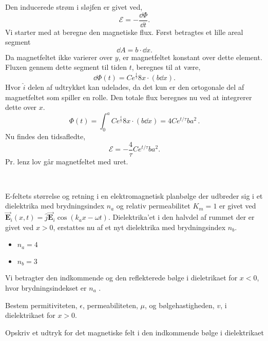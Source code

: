 \begin{solution}
Den inducerede strøm i sløjfen er givet ved,
\[
\mathcal{E} = -\frac{\dd \Phi}{\dd  t}
.\]
Vi starter med at beregne den magnetiske flux. Først betragtes et lille areal segment
\[
\dd A = b \cdot \dd x
.\]
Da magnetfeltet ikke varierer over $y$, er magnetfeltet konstant over dette element. Fluxen gennem dette segment til tiden $t$, beregnes til at være,
 \[
\dd \Phi \left( t \right) = Ce^{\frac{t}{\tau}}8x \cdot \left( b\dd x \right)  
.\]
Hvor $\hat{i}$ delen af udtrykket kan udelades, da det kun er den ortogonale del af magnetfeltet som spiller en rolle. Den totale flux beregnes nu ved at integrerer dette over $x$.
 \[
\Phi\left( t \right) = \int_{0}^{a} Ce^{\frac{t}{\tau}}8x \cdot \left( b\dd x \right)  = 4Ce^{t / \tau}ba^2
 \, 
.\]
Nu findes den tidsafledte,
\[
\mathcal{E} = -\frac{4}{\tau} Ce^{t / \tau}ba^2
.\]
Pr. lenz lov går magnetfeltet med uret.
\end{solution}\\
\begin{exercise}[Opgave 6]
E-feltets størrelse og retning i en elektromagnetisk planbølge der udbreder
sig i et dielektrika med brydningsindex $n_a$ og relativ permeabilitet $K_m = 1$ er
givet ved $\vec{\mathbf{E}} _i\left( x,t \right) = \hat{j}\vec{\mathbf{E}} _i\cos\left( k_ax-\omega t \right) $. Dielektrika’et i den halvdel af rummet der er givet ved $x > 0$, erstattes nu af et nyt dielektrika med brydningsindex $n_b$.
\begin{itemize}
	\item $n_a = 4$
	\item $n_b = 3$
\end{itemize}
Vi betragter den indkommende og den reflekterede bølge i dieletrikaet for $x < 0$, hvor brydningsindekset er $n_a$ .
\end{exercise}
\begin{subexercise}[i]
Bestem permitiviteten, $\epsilon$, permeabiliteten, $\mu$, og bølgehastigheden, $v$, i dielektrikaet for $x>0$.
\end{subexercise}
\begin{solution}

\end{solution}
\begin{subexercise}[ii]
Opskriv et udtryk for det magnetiske felt i den indkommende bølge i dielektrikaet
\end{subexercise}
\begin{solution}

\end{solution}
